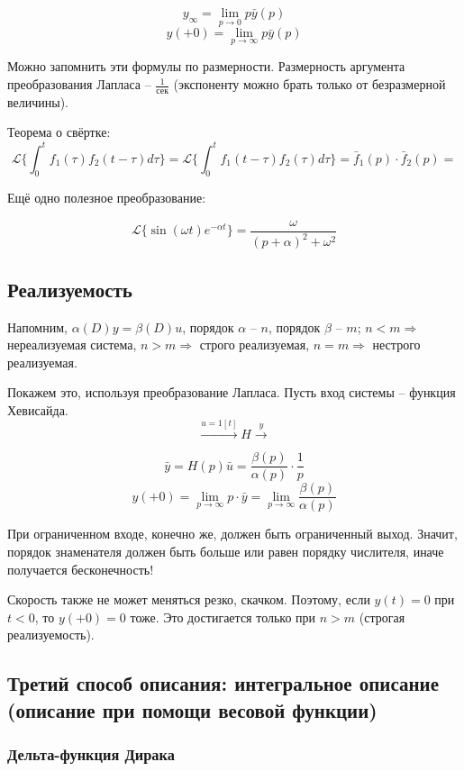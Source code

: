 \documentclass[main.tex]{subfiles}
\begin{document}
\[ y_\infty = \lim_{p \to 0} p \bar y(p) \]
\[ y(+0) = \lim_{p \to \infty} p \bar y(p) \]

Можно запомнить эти формулы по размерности.
Размерность аргумента преобразования Лапласа -- $ \frac{1}{\text{сек}} $ (экспоненту можно брать только от безразмерной величины).

Теорема о свёртке:
\[ \mathcal{L}\{ \int_{0}^{t} f_1(\tau) f_2(t-\tau) d\tau  \} = \mathcal{L}\{ \int_{0}^{t} f_1(t-\tau) f_2(\tau) d\tau \} = \bar f_1 (p) \cdot \bar f_2 (p) = \]

Ещё одно полезное преобразование:

\[ \mathcal{L}\{ \sin (\omega t) e^{-\alpha t} \} = \frac{\omega}{(p + \alpha)^2 + \omega^2} \]

\subsection{Реализуемость}

Напомним, $ \alpha(D)y = \beta(D) u $, порядок $ \alpha $ -- $ n $, порядок $ \beta $ -- $ m $; $ n < m \Rightarrow $ нереализуемая система, $ n > m \Rightarrow $ строго реализуемая, $ n = m \Rightarrow $ нестрого реализуемая.

Покажем это, используя преобразование Лапласа.
Пусть вход системы -- функция Хевисайда.
\[ \xrightarrow{u = 1[t]}\boxed{H}\xrightarrow{y} \]

$$ \bar y = H(p) \bar u = \frac{\beta(p)}{\alpha(p)} \cdot \frac{1}{p} $$
\[ y(+0) = \lim_{p \to \infty} p \cdot \bar y = \lim_{p \to \infty} \frac{\beta(p)}{\alpha(p)} \]

При ограниченном входе, конечно же, должен быть ограниченный выход.
Значит, порядок знаменателя должен быть больше или равен порядку числителя, иначе получается бесконечность!

Скорость также не может меняться резко, скачком.
Поэтому, если $ y(t) = 0 $ при $ t < 0 $, то $ y(+0) = 0 $ тоже.
Это достигается только при $ n > m $ (строгая реализуемость).

\subsection{Третий способ описания: интегральное описание (описание при помощи весовой функции)}

\subsubsection{ Дельта-функция Дирака }
\end{document}
